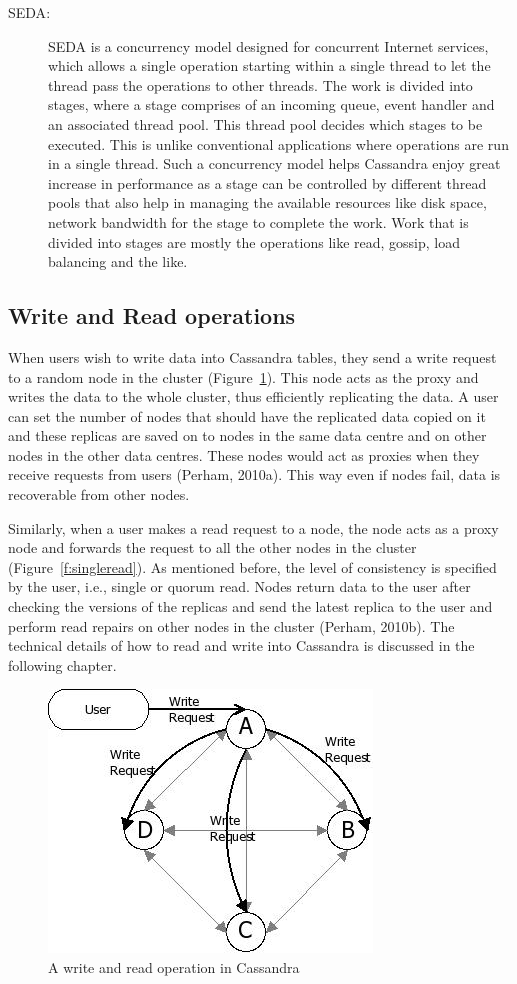 \begin{description}
  
  \item [\ac{SEDA}:] \ac{SEDA} is a concurrency model designed for concurrent
  Internet services, which allows a single operation starting within a single
  thread to let the thread pass the operations to other threads. The work is
  divided into stages, where a stage comprises of an incoming queue, event
  handler and an associated thread pool. This thread pool decides which stages
  to be executed. This is unlike conventional applications where operations are
  run in a single thread. Such a concurrency model helps Cassandra enjoy great
  increase in performance as a stage can be
  controlled by different thread pools that also help in managing the available
  resources like disk space, network bandwidth for the stage to complete the
  work. Work that is divided into stages are mostly the operations like read,
  gossip, load balancing and the like.
  
\end{description}
\subsection{ Write and Read operations}
When users wish to write data into Cassandra tables, they send a write request
to a random node in the cluster (Figure~\ref{f:writeRead}). This node acts as the proxy
and writes the data to the whole cluster, thus efficiently replicating the data.
A user can set the number of nodes that should have the
replicated data copied on it and these replicas are saved on to nodes in the
same data centre and on other nodes in the other data centres. These nodes would act
as proxies when they receive requests from users (Perham, 2010a). This way even
if nodes fail, data is recoverable from other nodes.
		

Similarly, when a user makes a read request to a node, the node acts as a proxy
node and forwards the request to all the other nodes in the cluster
(Figure~\ref{f:singleread}).
As mentioned before, the level of consistency is specified by the user, i.e.,
single or quorum read. Nodes return data to the user after checking the versions
of the replicas and send the latest replica to the user and perform read repairs
on other nodes in the cluster (Perham, 2010b).
The technical details of how to read and write into Cassandra is discussed in
the following chapter.

\begin{figure}[H]
			\centering
			\includegraphics[width=.45\textwidth]{./figure/Solutions/Write-Request-Cassandra.png}
						\caption{A write and read operation in Cassandra}\label{f:writeRead}
		\end{figure}
